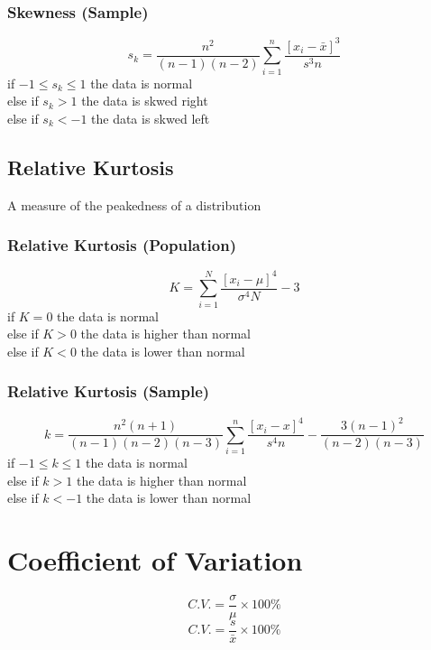 \documentclass[twocolumn]{article}
\begin{document}
\subsubsection{Skewness (Sample)}
\begin{equation}
    s_{k} = \frac{n^{2}}{(n-1)(n-2)}\sum_{i=1}^{n}\frac{[x_{i} - \bar{x}]^{3}}{s^{3}n}
\end{equation}
if $-1 \leq s_{k} \leq 1$ the data is normal\\
else if $s_{k} > 1$ the data is skwed right\\
else if $s_{k} < -1$ the data is skwed left
\subsection{Relative Kurtosis}
A measure of the peakedness of a distribution
\subsubsection{Relative Kurtosis (Population)}
\begin{equation}
    K = \sum_{i=1}^{N}\frac{[x_{i} - \mu]^{4}}{\sigma^{4}N} - 3
\end{equation}
if $K = 0$ the data is normal\\
else if $K > 0$ the data is higher than normal\\
else if $K < 0$ the data is lower than normal
\subsubsection{Relative Kurtosis (Sample)}
\tiny
\begin{equation}
    k = \frac{n^{2}(n+1)}{(n-1)(n-2)(n-3)} \sum_{i=1}^{n}\frac{[x_{i}-x]^{4}}{s^{4}n}-\frac{3(n-1)^{2}}{(n-2)(n-3)}
\end{equation}
\normalsize
if $-1 \leq k \leq 1$ the data is normal\\
else if $k > 1$ the data is higher than normal\\
else if $k < -1$ the data is lower than normal
\section{Coefficient of Variation}
\begin{equation}
    C.V. = \frac{\sigma}{\mu} \times 100\%
\end{equation}
\begin{equation}
    C.V. = \frac{s}{\bar{x}} \times 100\%
\end{equation}
\end{document}
